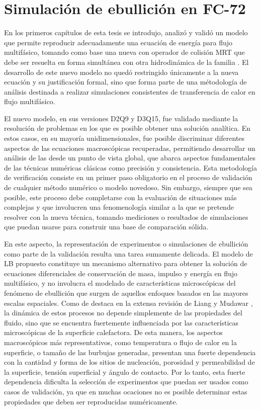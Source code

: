 \chapter{Simulaci\'on de ebullici\'on en FC-72}

En los primeros cap\'itulos de esta tesis se introdujo, analiz\'o y valid\'o un modelo que permite reproducir adecuadamente una ecuaci\'on de energ\'ia para flujo multif\'asico, tomando como base una nueva \lbe{} con operador de colisi\'on MRT que debe ser resuelta en forma simult\'anea con otra \lbe{} hidrodin\'amica de la familia \pp{}. El desarrollo de este nuevo modelo no qued\'o restringido \'unicamente a la nueva ecuaci\'on y su justificaci\'on formal, sino que forma parte de una m\'etodolog\'ia de an\'alisis destinada a realizar simulaciones consistentes de transferencia de calor en flujo multif\'asico.

El nuevo modelo, en sus versiones D2Q9 y D3Q15, fue validado mediante la resoluci\'on de problemas en los que es posible obtener una soluci\'on anal\'itica. En estos casos, en su mayor\'ia unidimensionales, fue posible discriminar diferentes aspectos de las ecuaciones macrosc\'opicas recuperadas, permitiendo desarrollar un an\'alisis de las \lbe{} desde un punto de vista global, que abarca aspectos fundamentales de las t\'ecnicas num\'ericas cl\'asicas como precisi\'on y consistencia. Esta metodolog\'ia de verificaci\'on consiste en un primer paso obligatorio en el proceso de validaci\'on de cualquier m\'etodo num\'erico o modelo novedoso. Sin embargo, siempre que sea posible, este proceso debe completarse con la evaluaci\'on de situaciones m\'as complejas y que involucren una fenomenolog\'ia similar a la que se pretende resolver con la nueva t\'ecnica, tomando mediciones o resultados de simulaciones que puedan usarse para construir una base de comparaci\'on s\'olida.

En este aspecto, la representaci\'on de experimentos o simulaciones de ebullici\'on como parte de la validaci\'on resulta una tarea sumamente delicada. El modelo de LB propuesto constituye un mecanismo alternativo para obtener la soluci\'on de ecuaciones diferenciales de conservaci\'on de masa, impulso y energ\'ia en flujo multif\'asico, y no involucra el modelado de caracter\'isticas microsc\'opicas del fen\'omeno de ebullici\'on que surgen de aquellos enfoques basados en las mayores escalas espaciales. Como de destaca en la extensa revisi\'on de Liang y Mudawar \cite{liang_review_2019}, la din\'amica de estos procesos no depende simplemente de las propiedades del fluido, sino que se encuentra fuertemente influenciada por las caracter\'isticas microsc\'opicas de la superficie calefactora. De esta manera, los aspectos macrosc\'opicos m\'as representativos, como temperatura o flujo de calor en la superficie, o tama\~no de las burbujas generadas, presentan una fuerte dependencia con la cantidad y forma de los sitios de nucleaci\'on, porosidad y permeabilidad de la superficie, tensi\'on superficial y \'angulo de contacto. Por lo tanto, esta fuerte dependencia dificulta la selecci\'on de experimentos que puedan ser usados como casos de validaci\'on, ya que en muchas ocaciones no es posible determinar estas propiedades que deben ser reproducidas num\'ericamente.

